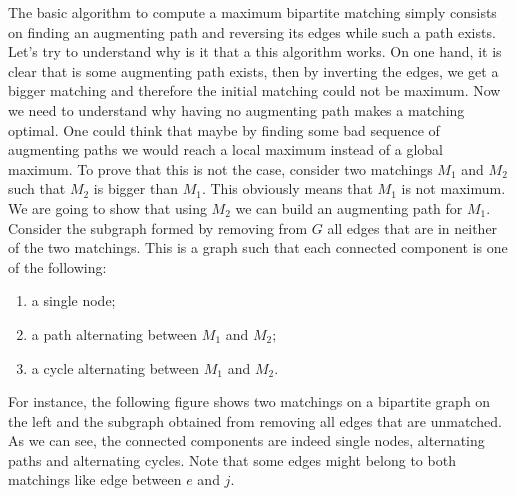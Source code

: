\documentclass[a4paper,10pt]{article}
\begin{document}
The basic algorithm to compute a maximum bipartite matching simply
consists on finding an augmenting path and reversing its edges while
such a path exists. \\
Let's try to understand why is it that a this algorithm works. On one hand,
it is clear that is some augmenting path exists, then by inverting the edges,
we get a bigger matching and therefore the initial matching could not be 
maximum. Now we need to understand why having no augmenting path makes a
matching optimal. One could think that maybe by finding some bad sequence
of augmenting paths we would reach a local maximum instead of a global
maximum. To prove that this is not the case, consider two matchings $M_1$ and $M_2$ such that $M_2$
is bigger than $M_1$. This obviously means that $M_1$ is not maximum. We are going
to show that using $M_2$ we can build an augmenting path for $M_1$. \\

Consider the subgraph formed by removing from
$G$ all edges that are in neither of the two matchings. This is a graph such that
each connected component is one of the following:

\begin{enumerate}
 \item a single node;
 \item a path alternating between $M_1$ and $M_2$;
 \item a cycle alternating between $M_1$ and $M_2$.
\end{enumerate}

For instance, the following figure shows two matchings on
a bipartite graph on the left and the subgraph obtained from
removing all edges that are unmatched. As we can see, the
connected components are indeed single nodes, alternating paths
and alternating cycles. Note that some edges might belong to both matchings like edge between
$e$ and $j$. \\
\end{document}
